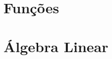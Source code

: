 \documentclass[11pt,fleqn]{book} %
\begin{document}





\part{Funções}						%



%
%
%
\part{Álgebra Linear}						%




%
%
%
%
%
%
\end{document}
